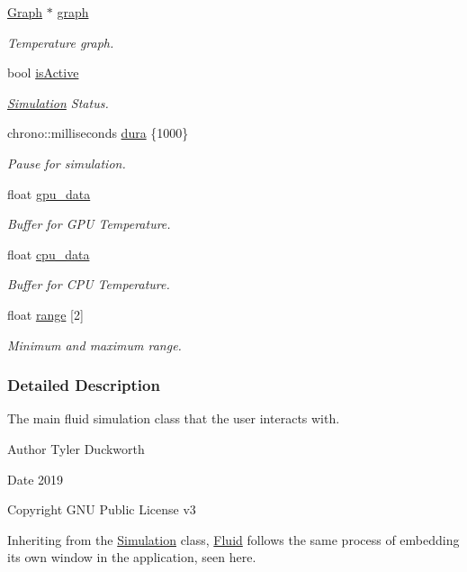 \begin{DoxyCompactItemize}
\mbox{\hyperlink{classGraph}{Graph}} $\ast$ \mbox{\hyperlink{classSmoke_a7a2faa3ba32e51c7eb4212622f31ed79}{graph}}
\begin{DoxyCompactList}\small\item\em Temperature graph. \end{DoxyCompactList}\item 
bool \mbox{\hyperlink{classSmoke_a83c338b4ec7a3d71443e8f1fd9d7a1b5}{is\+Active}}
\begin{DoxyCompactList}\small\item\em \mbox{\hyperlink{classSimulation}{Simulation}} Status. \end{DoxyCompactList}\item 
chrono\+::milliseconds \mbox{\hyperlink{classSmoke_ae62660aa3919c7a01b5a0c3ad5ec1715}{dura}} \{1000\}
\begin{DoxyCompactList}\small\item\em Pause for simulation. \end{DoxyCompactList}\item 
float \mbox{\hyperlink{classSmoke_afcd49fb97c3573ec4c779346d4be1c95}{gpu\+\_\+data}}
\begin{DoxyCompactList}\small\item\em Buffer for G\+PU Temperature. \end{DoxyCompactList}\item 
float \mbox{\hyperlink{classSmoke_a27ecb4dc9f91a34bed0637c1743275cb}{cpu\+\_\+data}}
\begin{DoxyCompactList}\small\item\em Buffer for C\+PU Temperature. \end{DoxyCompactList}\item 
float \mbox{\hyperlink{classSmoke_ae27bb310eec891bf0973a263383563a5}{range}} \mbox{[}2\mbox{]}
\begin{DoxyCompactList}\small\item\em Minimum and maximum range. \end{DoxyCompactList}\end{DoxyCompactItemize}


\subsubsection{Detailed Description}
The main fluid simulation class that the user interacts with. 

\begin{DoxyAuthor}{Author}
Tyler Duckworth 
\end{DoxyAuthor}
\begin{DoxyDate}{Date}
2019 
\end{DoxyDate}
\begin{DoxyCopyright}{Copyright}
G\+NU Public License v3
\end{DoxyCopyright}
Inheriting from the \mbox{\hyperlink{classSimulation}{Simulation}} class, \mbox{\hyperlink{classFluid}{Fluid}} follows the same process of embedding its own window in the application, seen here.

